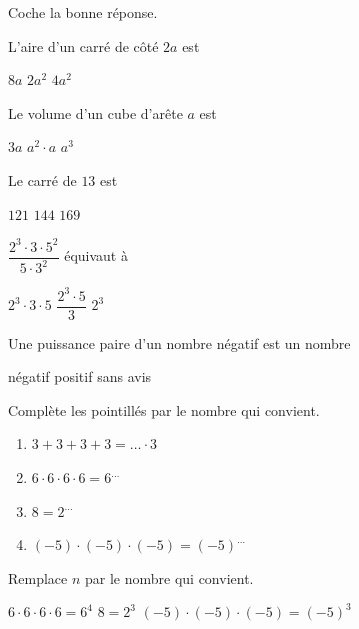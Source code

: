 \documentclass[../../syllabus_2.tex]{subfiles}
\begin{document}
\begin{solution}
	Coche la bonne réponse.\par
	\begin{tasks}
		\task L'aire d'un carré de côté \(2a\) est
		\begin{qcm}
			\choice \(8a\)
			\choice \(2a^2\)
			\correct \(4a^2\)
		\end{qcm}

		\task Le volume d'un cube d'arête \(a\) est
		\begin{qcm}
			\choice \(3a\)
			\choice \(a^2 \cdot a\)
			\correct \(a^3\)
		\end{qcm}

		\task Le carré de \(13\) est
		\begin{qcm}
			\choice \(121\)
			\choice \(144\)
			\correct \(169\)
		\end{qcm}

		\task \(\dfrac{2^3\cdot 3\cdot 5^2}{5\cdot 3^2}\) équivaut à
		\begin{qcm}
			\correct \(2^3\cdot 3\cdot 5\)
			\choice \(\dfrac{2^3\cdot5}{3}\)
			\choice \(2^3\)
		\end{qcm}

		\task Une puissance paire d'un nombre négatif est un nombre
		\begin{qcm}
			\choice négatif
			\correct positif
			\choice sans avis
		\end{qcm}
	\end{tasks}
\end{solution}
\begin{exercise}
	Complète les pointillés par le nombre qui convient.
	\begin{enumerate}[cols=2, itemsep=2em]
		\item \(3 + 3 + 3 + 3 = \ldots \cdot 3\)
		\item  \(6\cdot 6 \cdot 6 \cdot 6 = 6^{\dots}\)
		\item  \(8=2^{\dots}\)
		\item  \((-5)\cdot(-5)\cdot(-5) = (-5)^{\dots}\)
	\end{enumerate}
\end{exercise}
\begin{solution}
	Remplace \(n\) par le nombre qui convient.
	\begin{tasks}
		\task \(6\cdot 6 \cdot 6 \cdot 6 = 6^4\)
		\task \(8=2^3\)
		\task \((-5)\cdot(-5)\cdot(-5) = (-5)^3\)
	\end{tasks}
\end{solution}
\end{document}
